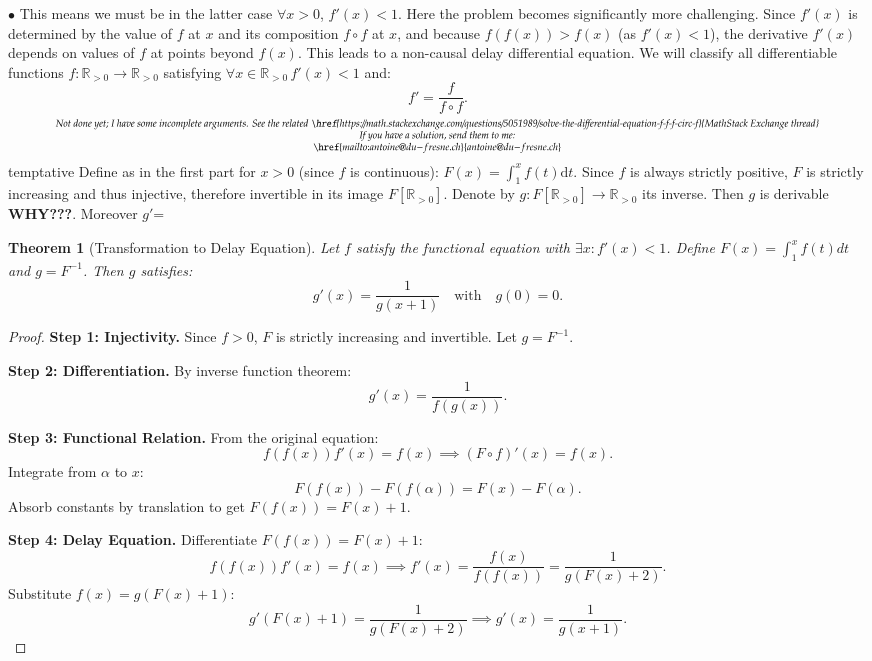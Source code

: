 \documentclass[11pt, a4paper, oneside]{article}
\newtheorem{theorem}{Theorem}
\theoremstyle{remark}
\theoremstyle{lemma}
\begin{document}
$\bullet$ This means we must be in the latter case $\forall x>0$, $f'(x) < 1$. Here the problem becomes significantly more challenging. Since $f'(x)$ is determined by the value of $f$ at $x$ and its composition $f \circ f$ at $x$, and because $f(f(x)) > f(x)$ (as $f'(x)<1$), the derivative $f'(x)$ depends on values of $f$ at points beyond $f(x)$. This leads to a non-causal delay differential equation. We will classify all differentiable functions \( f: \mathbb{R}_{>0} \to \mathbb{R}_{>0} \) satisfying $\forall x \in \mathbb{R}_{>0}\, f'(x) < 1$ and:
\[
f' = \frac{f}{f\circ f}.
\]
\[
\substack{\textit{Not done yet; I have some incomplete arguments. See the related \href{https://math.stackexchange.com/questions/5051989/solve-the-differential-equation-f-f-f-circ-f}{MathStack Exchange thread}}\\
\textit{If you have a solution, send them to me:} \\ \href{mailto:antoine@du-fresne.ch}{antoine@du-fresne.ch}}
\]
temptative
Define as in the first part for $x>0$ (since $f$ is continuous): $F(x)=\int_{1}^{x}f(t)\mathrm{d}t$. Since $f$ is always strictly positive, $F$ is strictly increasing and thus injective, therefore invertible in its image $F[\mathbb{R}_{>0}]$. Denote by $g:F[\mathbb{R}_{>0}]\rightarrow \mathbb{R}_{>0}$ its inverse. Then $g$ is derivable \textbf{ WHY???}. Moreover $g'$=
\begin{theorem}[Transformation to Delay Equation]\label{thm:delay}Let \( f \) satisfy the functional equation with \( \exists x: f'(x) < 1 \). Define \( F(x) = \int_{1}^x f(t)dt \) and \( g = F^{-1} \). 
Then \( g \) satisfies:
\[
g'(x) = \frac{1}{g(x + 1)} \quad \text{with} \quad g(0) = 0.
\]
\end{theorem}

\begin{proof}
\textbf{Step 1: Injectivity.} Since \( f > 0 \), \( F \) is strictly increasing and invertible. Let \( g = F^{-1} \).

\textbf{Step 2: Differentiation.} By inverse function theorem:
\[
g'(x) = \frac{1}{f(g(x))}.
\]

\textbf{Step 3: Functional Relation.} From the original equation:
\[
f(f(x))f'(x) = f(x) \implies (F \circ f)'(x) = f(x).
\]
Integrate from \( \alpha \) to \( x \):
\[
F(f(x)) - F(f(\alpha)) = F(x) - F(\alpha).
\]
Absorb constants by translation to get \( F(f(x)) = F(x) + 1 \).

\textbf{Step 4: Delay Equation.} Differentiate \( F(f(x)) = F(x) + 1 \):
\[
f(f(x))f'(x) = f(x) \implies f'(x) = \frac{f(x)}{f(f(x))} = \frac{1}{g(F(x) + 2)}.
\]
Substitute \( f(x) = g(F(x) + 1) \):
\[
g'(F(x) + 1) = \frac{1}{g(F(x) + 2)} \implies g'(x) = \frac{1}{g(x + 1)}.
\]
\end{proof}
\end{document}

